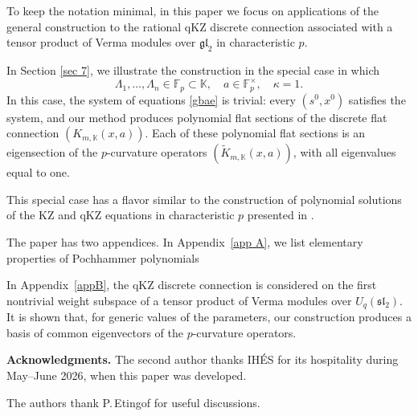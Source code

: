 \documentclass[12pt]{amsart}
\let\frak\mathfrak
\theoremstyle{definition} %
\numberwithin{equation}{section}
\theoremstyle{definition}
\let\ka\kappa
\let\La\Lambda
\def\F{{\mathbb F}}
\def\K{{\mathbb K}}
\begin{document}
To keep the notation minimal, in this paper we focus on applications of the general construction
 to the rational qKZ discrete connection associated with a tensor product of Verma modules over $\mathfrak{gl}_2$ in characteristic $p$.




\smallskip
In Section \ref{sec 7}, we illustrate the construction in the special case in which
\[
\La_{1},\dots,\La_{n}\in \F_p\subset \K,
\quad a\in\F_p^\times, \quad \ka=1.
\]
In this case, the system of equations \eqref{gbae} is trivial: every $(s^0,x^0)$ satisfies
the system, and our method produces polynomial flat sections of the discrete flat connection
$(K_{m,\K}(x,a))$. Each of these polynomial flat sections is an eigensection of the
$p$-curvature operators $(\tilde K_{m,\K}(x,a))$, with all eigenvalues equal to one.

This special case has a flavor similar to the construction of polynomial solutions of the
KZ and qKZ equations in characteristic $p$ presented in \cite{SV, MV1}.



\smallskip

The paper has two appendices. 
In Appendix~\ref{app A}, we list elementary properties of Pochhammer polynomials

In Appendix~\ref{appB}, the qKZ discrete connection is considered on the first nontrivial weight subspace of a tensor product of Verma modules over $U_q(\frak{sl}_2)$. It is shown that, for generic values of the parameters, our construction produces a basis of common eigenvectors of the $p$-curvature operators.



\smallskip

\noindent\textbf{Acknowledgments.}
The second author thanks IH\'ES for its hospitality during May--June 2026, when this paper was developed.


The authors thank P.\,Etingof for useful discussions.
\end{document}
